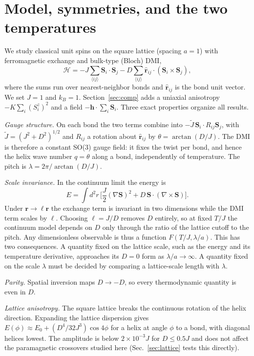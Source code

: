 \documentclass[prb,reprint,longbibliography,superscriptaddress,amsmath,amssymb]{revtex4-2}
\newcommand{\Sv}{\mathbf{S}}
\begin{document}
\section{Model, symmetries, and the two temperatures}
\label{sec:model}

We study classical unit spins on the square lattice (spacing $a=1$) with ferromagnetic exchange and bulk-type (Bloch) DMI,
\begin{equation}
\mathcal H=-J\sum_{\langle ij\rangle}\Sv_i\cdot\Sv_j-D\sum_{\langle ij\rangle}\hat{\mathbf r}_{ij}\cdot(\Sv_i\times\Sv_j),
\label{eq:H}
\end{equation}
where the sums run over nearest-neighbor bonds and $\hat{\mathbf r}_{ij}$ is the bond unit vector. We set $J=1$ and $k_B=1$. Section~\ref{sec:comp} adds a uniaxial anisotropy $-K\sum_i(S_i^z)^2$ and a field $-\mathbf h\cdot\sum_i\Sv_i$. Three exact properties organize all results.

\textit{Gauge structure.} On each bond the two terms combine into $-\tilde J\,\Sv_i\cdot R_{ij}\Sv_j$, with $\tilde J=(J^2+D^2)^{1/2}$ and $R_{ij}$ a rotation about $\hat{\mathbf r}_{ij}$ by $\theta=\arctan(D/J)$. The DMI is therefore a constant SO(3) gauge field: it fixes the twist per bond, and hence the helix wave number $q=\theta$ along a bond, independently of temperature. The pitch is $\lambda=2\pi/\arctan(D/J)$.

\textit{Scale invariance.} In the continuum limit the energy is
\begin{equation}
E=\int d^2r\,\Big[\frac{J}{2}(\nabla\Sv)^2+D\,\Sv\cdot(\nabla\times\Sv)\Big].
\label{eq:cont}
\end{equation}
Under $\mathbf r\to\ell\mathbf r$ the exchange term is invariant in two dimensions while the DMI term scales by $\ell$. Choosing $\ell=J/D$ removes $D$ entirely, so at fixed $T/J$ the continuum model depends on $D$ only through the ratio of the lattice cutoff to the pitch. Any dimensionless observable is thus a function $F(T/J,\lambda/a)$. This has two consequences. A quantity fixed on the lattice scale, such as the energy and its temperature derivative, approaches its $D=0$ form as $\lambda/a\to\infty$. A quantity fixed on the scale $\lambda$ must be decided by comparing a lattice-scale length with $\lambda$.

\textit{Parity.} Spatial inversion maps $D\to-D$, so every thermodynamic quantity is even in $D$.

\textit{Lattice anisotropy.} The square lattice breaks the continuous rotation of the helix direction. Expanding the lattice dispersion gives $E(\phi)\approx E_0+(D^4/32J^3)\cos4\phi$ for a helix at angle $\phi$ to a bond, with diagonal helices lowest. The amplitude is below $2\times10^{-3}J$ for $D\le0.5J$ and does not affect the paramagnetic crossovers studied here (Sec.~\ref{sec:lattice} tests this directly).
\end{document}

